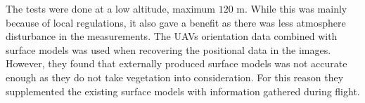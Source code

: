 The tests were done at a low altitude, maximum $120$ m. While this was mainly because of local regulations, it also gave a benefit as there was less atmosphere disturbance in the measurements. The UAVs orientation data combined with surface models was used when recovering the positional data in the images. However, they found that externally produced surface models was not accurate enough as they do not take vegetation into consideration. For this reason they supplemented the existing surface models with information gathered during flight.